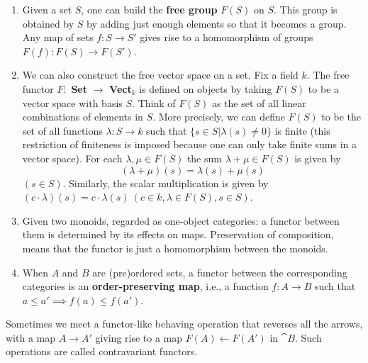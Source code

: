 \documentclass[11pt,a4paper]{article}
\begin{document}
\begin{example}\leavevmode
    \begin{enumerate}[label=(\alph*)]
        \item Given a set $S$, one can build the \textbf{free group} $F(S)$ on $S$. This group is obtained by $S$ by adding just enough elements so that it becomes a group.\\
            Any map of sets $f: S\to S'$ gives rise to a homomorphism of groups $F(f): F(S)\to F(S')$.
        \item We can also construct the free vector space on a set. Fix a field $k$. The free functor $F:$ \textbf{Set} $\to$ \textbf{Vect}$_k$ is defined on objects by taking $F(S)$ to be a vector space with basis $S$. Think of $F(S)$ as the set of all linear combinations of elements in $S$. More precisely, we can define $F(S)$ to be the set of all functions $\lambda: S\to k$ such that $\{s\in S | \lambda(s)\neq 0\}$ is finite (this restriction of finiteness is imposed because one can only take finite sums in a vector space). For each $\lambda, \mu \in F(S)$ the sum $\lambda + \mu \in F(S)$ is given by
            $$(\lambda + \mu)(s) = \lambda(s) + \mu(s)$$
            $(s \in S)$. Similarly, the scalar multiplication is given by $(c\cdot \lambda)(s) = c\cdot \lambda(s)\ (c\in k, \lambda\in F(S), s\in S)$.
        \item Given two monoids, regarded as one-object categories: a functor between them is determined by its effects on maps. Preservation of composition, means that the functor is just a homomorphism between the monoids. 
        \item When $A$ and $B$ are (pre)ordered sets, a functor between the corresponding categories is an \textbf{order-preserving map}, i.e., a function $f: A\to B$ such that $a\leq a' \implies f(a) \leq f(a')$.
    \end{enumerate}
\end{example}

Sometimes we meet a functor-like behaving operation that reverses all the arrows, with a map $A\to A'$ giving rise to a map $F(A)\leftarrow F(A')$ in $\cat{B}$. Such operations are called contravariant functors.
\end{document}
